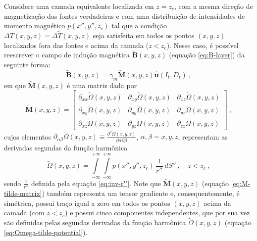 Considere uma camada equivalente localizada em $z = z_{c}$, com a mesma direção de magnetização 
das fontes verdadeiras e com uma distribuição de intensidades de momento magnético $p(x'', y'', z_{c})$
tal que a condição $\Delta T(x, y, z) = \Delta \tilde{T}(x, y, z)$ seja satisfeita em todos os pontos 
$(x, y, z)$ localizados fora das fontes e acima da camada ($z < z_{c}$).
Nesse caso, é possível reescrever o campo de indução magnética $\tilde{\mathbf{B}}(x, y, z)$
(equação \ref{eq:B-layer}) da seguinte forma:
\begin{equation}
\tilde{\mathbf{B}}(x, y, z) = \gamma_{m} \tilde{\mathbf{M}}(x, y, z) \hat{\mathbf{u}}(I_{t}, D_{t}) \: ,
\label{eq:B-layer-alternative}
\end{equation}
em que $\tilde{\mathbf{M}}(x, y, z)$ é uma matriz dada por
\begin{equation}
	\tilde{\mathbf{M}}(x, y, z) = \begin{bmatrix}
		\partial_{xx} \tilde{\Omega}(x, y, z) & 
		\partial_{xy} \tilde{\Omega}(x, y, z) &
		\partial_{xz} \tilde{\Omega}(x, y, z) \\
		\partial_{xy} \tilde{\Omega}(x, y, z) & 
		\partial_{yy} \tilde{\Omega}(x, y, z) &
		\partial_{yz} \tilde{\Omega}(x, y, z) \\
		\partial_{xz} \tilde{\Omega}(x, y, z) & 
		\partial_{yz} \tilde{\Omega}(x, y, z) &
		\partial_{zz} \tilde{\Omega}(x, y, z)
	\end{bmatrix} \: ,
	\label{eq:M-tilde-matrix}
\end{equation}
cujos elementos $\partial_{\alpha\beta} \tilde{\Omega}(x, y, z) \equiv 
\frac{\partial^{2} \tilde{\Omega}(x, y, z)}{\partial \alpha \partial \beta}$, 
$\alpha, \beta = x, y, z$, representam as derivadas segundas da função harmônica 
\begin{equation}
\tilde{\Omega}(x, y, z) = \int\limits_{-\infty}^{+\infty}\int\limits_{-\infty}^{+\infty} 
p(x'', y'', z_{c}) \, \frac{1}{r''} \: dS'' \: , \quad z < z_{c} \: ,
\label{eq:Omega-tilde-potential}
\end{equation}
sendo $\frac{1}{r''}$ definida pela equação \ref{eq:inv-r''}.
Note que $\tilde{\mathbf{M}}(x, y, z)$ (equação \ref{eq:M-tilde-matrix}) também representa um tensor gradiente 
\citep{pedersen_rasmussen1990} e, consequentemente, é simétrica, possui traço igual a zero em todos os pontos 
$(x,y,z)$ acima da camada (com $z < z_{c}$) e possui cinco componentes independentes, que por sua vez são 
definidas pelas segundas derivadas da função harmônica 
$\tilde{\Omega}(x, y, z)$ (equação \ref{eq:Omega-tilde-potential}).
